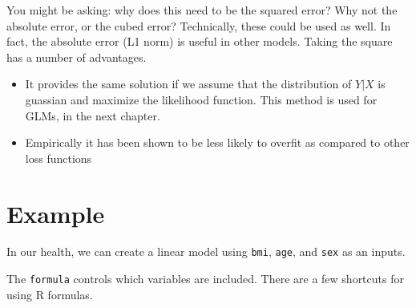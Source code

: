 \documentclass[openany]{book}
\providecommand{\tightlist}{%
  \setlength{\itemsep}{0pt}\setlength{\parskip}{0pt}}
\begin{document}
You might be asking: why does this need to be the squared error? Why not the absolute error, or the cubed error? Technically, these could be used as well. In fact, the absolute error (L1 norm) is useful in other models. Taking the square has a number of advantages.

\begin{itemize}
\tightlist
\item
  It provides the same solution if we assume that the distribution of \(Y|X\) is guassian and maximize the likelihood function. This method is used for GLMs, in the next chapter.
\item
  Empirically it has been shown to be less likely to overfit as compared to other loss functions
\end{itemize}

\hypertarget{example}{%
\section{Example}\label{example}}

In our health, we can create a linear model using \texttt{bmi}, \texttt{age}, and \texttt{sex} as an inputs.

The \texttt{formula} controls which variables are included. There are a few shortcuts for using R formulas.
\end{document}
